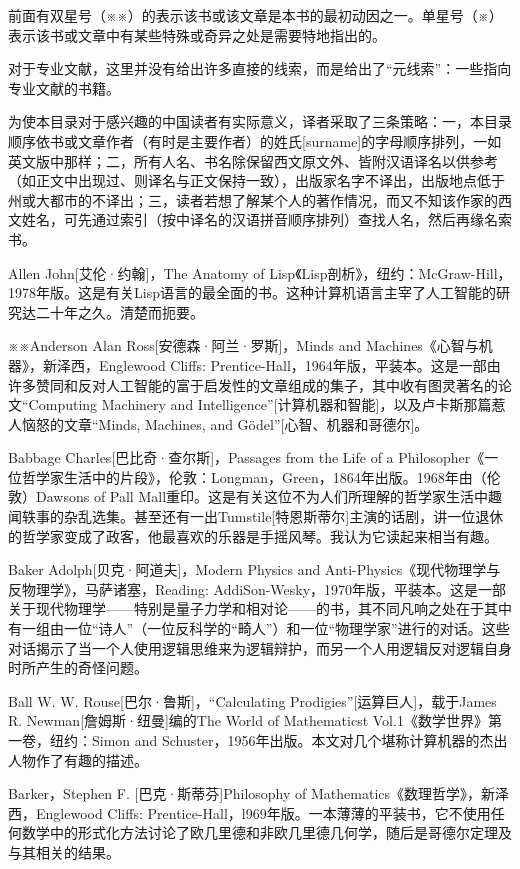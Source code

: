 \documentclass[
  12pt,
  twoside,
  openright,
  oldfontcommands,
]{memoir}
\begin{document}
前面有双星号（※※）的表示该书或该文章是本书的最初动因之一。单星号（※）表示该书或文章中有某些特殊或奇异之处是需要特地指出的。

对于专业文献，这里并没有给出许多直接的线索，而是给出了``元线索''：一些指向专业文献的书籍。

为使本目录对于感兴趣的中国读者有实际意义，译者采取了三条策略：一，本目录顺序依书或文章作者（有时是主要作者）的姓氏{[}surname{]}的字母顺序排列，一如英文版中那样；二，所有人名、书名除保留西文原文外、皆附汉语译名以供参考（如正文中出现过、则译名与正文保持一致），出版家名字不译出，出版地点低于州或大都市的不译出；三，读者若想了解某个人的著作情况，而又不知该作家的西文姓名，可先通过索引（按中译名的汉语拼音顺序排列）查找人名，然后再缘名索书。

\hfill\break

Allen John{[}艾伦·约翰{]}，The Anatomy of Lisp《Lisp剖析》，纽约：McGraw-Hill，1978年版。这是有关Lisp语言的最全面的书。这种计算机语言主宰了人工智能的研究达二十年之久。清楚而扼要。

※※Anderson Alan Ross{[}安德森·阿兰·罗斯{]}，Minds and Machines《心智与机器》，新泽西，Englewood Cliffs: Prentice-Hall，1964年版，平装本。这是一部由许多赞同和反对人工智能的富于启发性的文章组成的集子，其中收有图灵著名的论文``Computing Machinery and Intelligence''{[}计算机器和智能{]}，以及卢卡斯那篇惹人恼怒的文章``Minds, Machines, and Gödel''{[}心智、机器和哥德尔{]}。

Babbage Charles{[}巴比奇·查尔斯{]}，Passages from the Life of a Philosopher《一位哲学家生活中的片段》，伦敦：Longman，Green，1864年出版。1968年由（伦敦）Dawsons of Pall Mall重印。这是有关这位不为人们所理解的哲学家生活中趣闻轶事的杂乱选集。甚至还有一出Tumstile{[}特恩斯蒂尔{]}主演的话剧，讲一位退休的哲学家变成了政客，他最喜欢的乐器是手摇风琴。我认为它读起来相当有趣。

Baker Adolph{[}贝克·阿道夫{]}，Modern Physics and Anti-Physics《现代物理学与反物理学》，马萨诸塞，Reading: AddiSon-Wesky，1970年版，平装本。这是一部关于现代物理学------特别是量子力学和相对论------的书，其不同凡响之处在于其中有一组由一位``诗人''（一位反科学的``畸人''）和一位``物理学家''进行的对话。这些对话揭示了当一个人使用逻辑思维来为逻辑辩护，而另一个人用逻辑反对逻辑自身时所产生的奇怪问题。

Ball W. W. Rouse{[}巴尔·鲁斯{]}，``Calculating Prodigies''{[}运算巨人{]}，载于James R. Newman{[}詹姆斯·纽曼{]}编的The World of Mathematicst Vol.1《数学世界》第一卷，纽约：Simon and Schuster，1956年出版。本文对几个堪称计算机器的杰出人物作了有趣的描述。

Barker，Stephen F. {[}巴克·斯蒂芬{]}Philosophy of Mathematics《数理哲学》，新泽西，Englewood Cliffs: Prentice-Hall，l969年版。一本薄薄的平装书，它不使用任何数学中的形式化方法讨论了欧几里德和非欧几里德几何学，随后是哥德尔定理及与其相关的结果。
\end{document}
